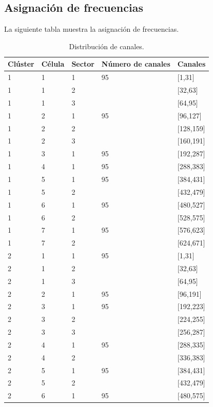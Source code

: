 \documentclass[11pt,letterpaper]{article}
\begin{document}
\subsection{Asignación de frecuencias}
La siguiente tabla muestra la asignación de frecuencias.
\begin{table}[ht]
    \centering
    \begin{tabular}{|l|l|l|l|l|}
    \hline
    Clúster & Célula & Sector & Número de canales & Canales \\ \hline
    1 & 1 & 1 & 95 & [1,31] \\ \hline
    1 & 1 & 2 &  & [32,63] \\ \hline
    1 & 1 & 3 &  & [64,95] \\ \hline

    1 & 2 & 1 & 95 & [96,127] \\ \hline
    1 & 2 & 2 &  & [128,159] \\ \hline
    1 & 2 & 3 &  & [160,191] \\ \hline

    1 & 3 & 1 & 95 & [192,287] \\ \hline

    1 & 4 & 1 & 95 & [288,383] \\ \hline

    1 & 5 & 1 & 95 & [384,431] \\ \hline
    1 & 5 & 2 &  & [432,479] \\ \hline

    1 & 6 & 1 & 95 & [480,527] \\ \hline
    1 & 6 & 2 &  & [528,575] \\ \hline

    1 & 7 & 1 & 95 & [576,623] \\ \hline
    1 & 7 & 2 &  & [624,671] \\ \hline

    2 & 1 & 1 & 95 & [1,31] \\ \hline
    2 & 1 & 2 &  & [32,63] \\ \hline
    2 & 1 & 3 &  & [64,95] \\ \hline

    2 & 2 & 1 & 95 & [96,191] \\ \hline

    2 & 3 & 1 & 95 & [192,223] \\ \hline
    2 & 3 & 2 &  & [224,255] \\ \hline
    2 & 3 & 3 &  & [256,287] \\ \hline

    2 & 4 & 1 & 95 & [288,335] \\ \hline
    2 & 4 & 2 &  & [336,383] \\ \hline

    2 & 5 & 1 & 95 & [384,431] \\ \hline
    2 & 5 & 2 &  & [432,479] \\ \hline

    2 & 6 & 1 & 95 & [480,575] \\ \hline
    \end{tabular}
    \caption{Distribución de canales.}
\end{table}
\end{document}

